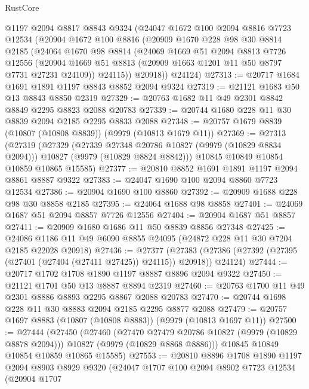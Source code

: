 \begin{lexlean}{RustCore}
\begin{coremodule}
    @1197
    @2094
    @8817
    @8843
    @9324
    (@24047
      @1672
      @100
      @2094
      @8816
      @7723
      @12534
      (@20904
        @1672
        @100
        @8816
        (@20909
          @1670
          @228
          @98
          @30
          @8814
          @2185
          (@24064
            @1670
            @98
            @8814
            (@24069
              @1669
              @51
              @2094
              @8813
              @7726
              @12556
              (@20904 @1669 @51 @8813 (@20909 @1663 @1201 @11 @50 @8797 @7731 @27231 @24109))
              @24115))
          @20918))
      @24124)
@27313 := @20717 @1684 @1691 @1891 @1197 @8843 @8852 @2094 @9324
@27319 := @21121 @1683 @50 @13 @8843 @8850 @2319
@27329 := @20763 @1682 @11 @49 @2301 @8842 @8849 @2295 @8823 @2088 @20783
@27339 := @20744 @1680 @228 @11 @30 @8839 @2094 @2185 @2295 @8833 @2088
@27348 := @20757 @1679 @8839 (@10807 (@10808 @8839)) (@9979 (@10813 @1679 @11))
@27369 := @27313
    (@27319
      (@27329
        (@27339 @27348 @20786 @10827 (@9979 (@10829 @8834 @2094)))
        @10827
        (@9979 (@10829 @8824 @8842)))
      @10845
      @10849
      @10854
      @10859
      @10865
      @15585)
@27377 := @20810 @8852 @1691 @1891 @1197 @2094 @8861 @8887 @9322
@27383 := @24047 @1690 @100 @2094 @8860 @7723 @12534
@27386 := @20904 @1690 @100 @8860
@27392 := @20909 @1688 @228 @98 @30 @8858 @2185
@27395 := @24064 @1688 @98 @8858
@27401 := @24069 @1687 @51 @2094 @8857 @7726 @12556
@27404 := @20904 @1687 @51 @8857
@27411 := @20909 @1680 @1686 @11 @50 @8839 @8856 @27348
@27425 := @24086 @1186 @11 @49 @6090 @8855 @24095 (@24872 @228 @11 @30 @7204 @2185 @22028 @20918)
@27436 := @27377
    (@27383 (@27386 (@27392 (@27395 (@27401 (@27404 (@27411 @27425)) @24115)) @20918)) @24124)
@27444 := @20717 @1702 @1708 @1890 @1197 @8887 @8896 @2094 @9322
@27450 := @21121 @1701 @50 @13 @8887 @8894 @2319
@27460 := @20763 @1700 @11 @49 @2301 @8886 @8893 @2295 @8867 @2088 @20783
@27470 := @20744 @1698 @228 @11 @30 @8883 @2094 @2185 @2295 @8877 @2088
@27479 := @20757 @1697 @8883 (@10807 (@10808 @8883)) (@9979 (@10813 @1697 @11))
@27500 := @27444
    (@27450
      (@27460
        (@27470 @27479 @20786 @10827 (@9979 (@10829 @8878 @2094)))
        @10827
        (@9979 (@10829 @8868 @8886)))
      @10845
      @10849
      @10854
      @10859
      @10865
      @15585)
@27553 := @20810
    @8896
    @1708
    @1890
    @1197
    @2094
    @8903
    @8929
    @9320
    (@24047
      @1707
      @100
      @2094
      @8902
      @7723
      @12534
      (@20904
        @1707

\end{coremodule}
\end{lexlean}
